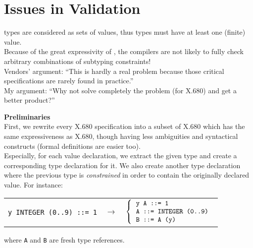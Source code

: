 \documentclass[12pt]{article}
\begin{document}
\section{Issues in Validation}
\begin{slide}

\ASN types are considered as sets of values, thus types must have at
least one (finite) value.\\

Because of the great expressivity of \ASN, the compilers are not
likely to fully check arbitrary combinations of subtyping
constraints!\\

Vendors' argument: ``This is hardly a real problem because
those critical specifications are rarely found in practice.'' \\

My argument: ``Why not solve completely the problem (for X.680) and
get a better product?''

\bigskip \bigskip \bigskip \bigskip \bigskip

\pagebreak

\textbf{Preliminaries}\\

First, we rewrite every X.680 specification
into a subset of X.680 which has the same expressiveness as X.680,
though having less ambiguities and syntactical constructs (formal
definitions are easier too).\\

Especially, for each value declaration, we extract the given type and
create a corresponding type declaration for it. We also create another
type declaration where the previous type is \emph{constrained} in
order to contain the originally declared value. For instance:

\begin{tabular}{rcl}
   \verb+y INTEGER (0..9) ::= 1+
   & $\longrightarrow$ 
   & $\left\{
       \begin{tabular}{l} 
           \verb+y A ::= 1+ \\
           \verb+A ::= INTEGER (0..9)+ \\
           \verb+B ::= A (y)+
        \end{tabular}
     \right.$
\end{tabular}

where \verb+A+ and \verb+B+ are fresh type references.

\pagebreak


\end{slide}
\end{document}
